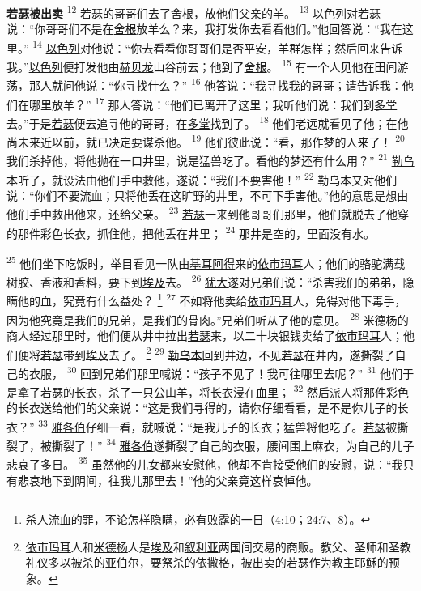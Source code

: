 \textbf{若瑟被出卖 }
\textsuperscript{12}
\uline{若瑟}的哥哥们去了\uline{舍根}，放他们父亲的羊。
\textsuperscript{13}
\uline{以色列}对\uline{若瑟}说：“你哥哥们不是在\uline{舍根}放羊么？来，我打发你去看看他们。”他回答说：“我在这里。”
\textsuperscript{14}
\uline{以色列}对他说：“你去看看你哥哥们是否平安，羊群怎样；然后回来告诉我。”\uline{以色列}便打发他由\uline{赫贝龙}山谷前去；他到了\uline{舍根}。
\textsuperscript{15}
有一个人见他在田间游荡，那人就问他说：“你寻找什么？”
\textsuperscript{16}
他答说：“我寻找我的哥哥；请告诉我：他们在哪里放羊？”
\textsuperscript{17}
那人答说：“他们已离开了这里；我听他们说：我们到\uline{多堂}去。”于是\uline{若瑟}便去追寻他的哥哥，在\uline{多堂}找到了。
\textsuperscript{18}
他们老远就看见了他；在他尚未来近以前，就已决定要谋杀他。
\textsuperscript{19}
他们彼此说：“看，那作梦的人来了！
\textsuperscript{20}
我们杀掉他，将他抛在一口井里，说是猛兽吃了。看他的梦还有什么用？”
\textsuperscript{21}
\uline{勒乌本}听了，就设法由他们手中救他，遂说：“我们不要害他！”
\textsuperscript{22}
\uline{勒乌本}又对他们说：“你们不要流血；只将他丢在这旷野的井里，不可下手害他。”他的意思是想由他们手中救出他来，还给父亲。
\textsuperscript{23}
\uline{若瑟}一来到他哥哥们那里，他们就脱去了他穿的那件彩色长衣，抓住他，把他丢在井里；
\textsuperscript{24}
那井是空的，里面没有水。

\textsuperscript{25}
他们坐下吃饭时，举目看见一队由\uline{基耳}\uline{阿得}来的\uline{依市}\uline{玛耳}人；他们的骆驼满载树胶、香液和香料，要下到\uline{埃及}去。
\textsuperscript{26}
\uline{犹大}遂对兄弟们说：“杀害我们的弟弟，隐瞒他的血，究竟有什么益处？
\footnote{杀人流血的罪，不论怎样隐瞒，必有败露的一日（4:10；24:7、8）。}
\textsuperscript{27}
不如将他卖给\uline{依市}\uline{玛耳}人，免得对他下毒手，因为他究竟是我们的兄弟，是我们的骨肉。”兄弟们听从了他的意见。
\textsuperscript{28}
\uline{米德杨}的商人经过那里时，他们便从井中拉出\uline{若瑟}来，以二十块银钱卖给了\uline{依市}\uline{玛耳}人；他们便将\uline{若瑟}带到\uline{埃及}去了。
\footnote{\uline{依市玛耳}人和\uline{米德杨}人是\uline{埃及}和\uline{叙利亚}两国间交易的商贩。教父、圣师和圣教礼仪多以被杀的\uline{亚伯尔}，要祭杀的\uline{依撒格}，被出卖的\uline{若瑟}作为教主\uline{耶稣}的预象。}
\textsuperscript{29}
\uline{勒乌本}回到井边，不见\uline{若瑟}在井内，遂撕裂了自己的衣服，
\textsuperscript{30}
回到兄弟们那里喊说：“孩子不见了！我可往哪里去呢？”
\textsuperscript{31}
他们于是拿了\uline{若瑟}的长衣，杀了一只公山羊，将长衣浸在血里；
\textsuperscript{32}
然后派人将那件彩色的长衣送给他们的父亲说：“这是我们寻得的，请你仔细看看，是不是你儿子的长衣？”
\textsuperscript{33}
\uline{雅各伯}仔细一看，就喊说：“是我儿子的长衣；猛兽将他吃了。\uline{若瑟}被撕裂了，被撕裂了！”
\textsuperscript{34}
\uline{雅各伯}遂撕裂了自己的衣服，腰间围上麻衣，为自己的儿子悲哀了多日。
\textsuperscript{35}
虽然他的儿女都来安慰他，他却不肯接受他们的安慰，说：“我只有悲哀地下到阴间，往我儿那里去！”他的父亲竟这样哀悼他。

